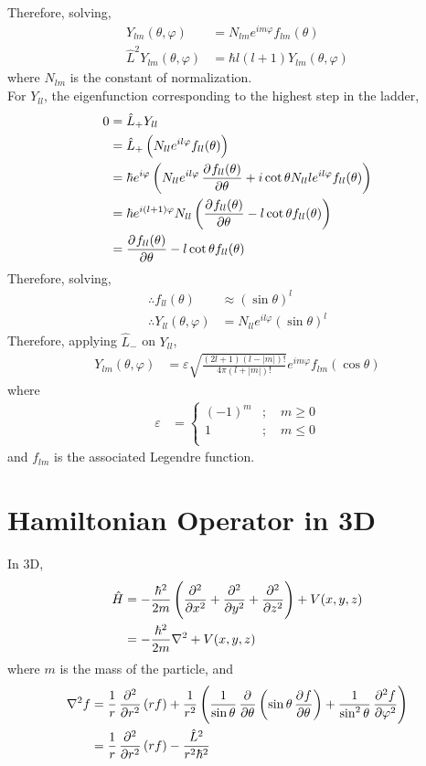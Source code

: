 \documentclass[titlepage, fleqn, a4paper, 12pt, twoside]{article}
\theoremstyle{definition}
\theoremstyle{theorem}
\let\Oldsection\section
\renewcommand{\section}{\FloatBarrier\Oldsection}
\begin{document}
Therefore, solving,
\begin{align*}
	Y_{l m}(\theta,\varphi) &= N_{l m} e^{i m \varphi} f_{l m}(\theta)\\
	\hat{L}^2 Y_{l m}(\theta,\varphi) &= \hbar l (l + 1) Y_{l m}(\theta,\varphi)
\end{align*}
where $N_{l m}$ is the constant of normalization.\\
For $Y_{l l}$, the eigenfunction corresponding to the highest step in the ladder,
\begin{align*}
	0 &= \hat{L}_+ Y_{l l}\\
	&= \hat{L}_+ \left( N_{l l} e^{i l \varphi} f_{l l}(\theta) \right)\\
	&= \hbar e^{i \varphi} \left( N_{l l} e^{i l \varphi} \dpd{f_{l l}(\theta)}{\theta} + i \cot \theta N_{l l} l e^{i l \varphi} f_{l l}(\theta) \right)\\
	&= \hbar e^{i (l + 1) \varphi} N_{l l} \left( \dpd{f_{l l}(\theta)}{\theta} - l \cot \theta f_{l l}(\theta) \right)\\
	&= \dpd{f_{l l}(\theta)}{\theta} - l \cot \theta f_{l l}(\theta)
\end{align*}
Therefore, solving,
\begin{align*}
	\therefore f_{l l}(\theta) &\approx (\sin \theta)^l\\
	\therefore Y_{l l}(\theta,\varphi) &= N_{l l} e^{i l \varphi} (\sin \theta)^l
\end{align*}
Therefore, applying $\hat{L}_-$ on $Y_{l l}$,
\begin{align*}
	Y_{l m}(\theta,\varphi) &= \varepsilon \sqrt{\frac{(2 l + 1) \left( l - |m| \right)!}{4 \pi \left( l + |m| \right)!}} e^{i m \varphi} f_{l m}(\cos \theta)
\end{align*}
where
\begin{align*}
	\varepsilon &=
		\begin{cases}
			(-1)^m &;\quad m \ge 0\\
			1 &;\quad m \le 0\\
		\end{cases}
\end{align*}
and $f_{l m}$ is the associated Legendre function.

\section{Hamiltonian Operator in 3D}

In 3D,
\begin{align*}
	\hat{H} &= -\frac{\hbar^2}{2 m} \left( \dpd[2]{}{x} + \dpd[2]{}{y} + \dpd[2]{}{z} \right) + V(x,y,z)\\
	&= -\frac{\hbar^2}{2 m} \nabla^2 + V(x,y,z)
\end{align*}
where $m$ is the mass of the particle, and
\begin{align*}
	\nabla^2 f &= \frac{1}{r} \dpd[2]{}{r}(r f) + \frac{1}{r^2} \left( \frac{1}{\sin \theta} \dpd{}{\theta}\left( \sin \theta \dpd{f}{\theta} \right) + \frac{1}{\sin^2 \theta} \dpd[2]{f}{\varphi} \right)\\
	&= \frac{1}{r} \dpd[2]{}{r}(r f) - \frac{\hat{L}^2}{r^2 \hbar^2}
\end{align*}
\end{document}

